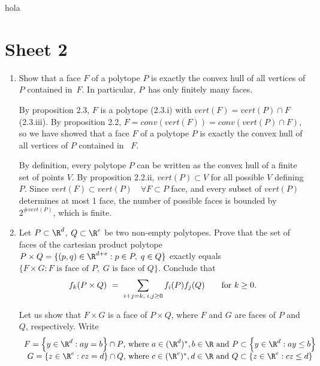 
hola




\section{Sheet 2}
\begin{enumerate}

\item Show that a face $F$ of a polytope $P$ is exactly the convex hull of all vertices of $P$ contained in~$F$. 
In particular, $P$~has only finitely many faces.

By proposition 2.3, $F$ is a polytope (2.3.i) with $vert(F)=vert(P)\cap F$ (2.3.iii). By proposition 2.2, $F=conv(vert(F))=conv(vert(P)\cap F)$, so we have showed that a face $F$ of a polytope $P$ is exactly the convex hull of all vertices of $P$ contained in ~$F$.

By definition, every polytope $P$ can be written as the convex hull of a finite set of points $V$. By proposition 2.2.ii, $vert(P)\subset V$ for all possible $V$ defining $P$. Since $vert(F)\subset vert(P) \quad\forall F\subset P$ face, and every subset of $vert(P)$ determines at most 1 face, the number of possible faces is bounded by $2^{\#vert(P)}$, which is finite.

\item Let $P\subset\R^d$, $Q\subset\R^e$ be two non-empty polytopes. Prove that the set of faces of the cartesian product polytope $P\times Q=\{(p,q)\in\R^{d+e}:p\in P,\; q\in Q\}$ exactly equals $\{F\times G: F\text{ is face of }P, \;G\text{ is face of }Q\}$. Conclude that
\[
    f_k(P\times Q)
    \ = \
    \sum_{%
      i+j=k,\;i,j\ge0}f_i(P) f_j(Q)
    \qquad
    \text{for } k\ge0.
\]

Let us show that $F\times G$ is a face of $P\times Q$, where $F$ and $G$ are faces of $P$ and $Q$, respectively. Write \[
\begin{array}{c}
 F=\left\{y\in\R^d:ay=b\right\}\cap P\text{, where } a\in(\R^d)^*, b\in\R \text{ and }P\subset\left\{y\in\R^d:ay\leq b\right\}\\
 G=\left\{z\in\R^e:cz=d\right\}\cap Q\text{, where } c\in(\R^e)^*, d\in\R \text{ and }Q\subset\left\{z\in\R^e:cz\leq d\right\}
\end{array}
\]


\end{enumerate}
